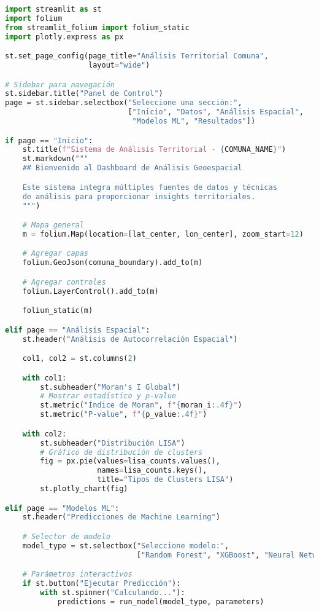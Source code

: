 \documentclass[12pt,a4paper]{article}
\begin{document}
\begin{lstlisting}[language=Python]
import streamlit as st
import folium
from streamlit_folium import folium_static
import plotly.express as px

st.set_page_config(page_title="Análisis Territorial Comuna",
                   layout="wide")

# Sidebar para navegación
st.sidebar.title("Panel de Control")
page = st.sidebar.selectbox("Seleccione una sección:",
                            ["Inicio", "Datos", "Análisis Espacial",
                             "Modelos ML", "Resultados"])

if page == "Inicio":
    st.title(f"Sistema de Análisis Territorial - {COMUNA_NAME}")
    st.markdown("""
    ## Bienvenido al Dashboard de Análisis Geoespacial

    Este sistema integra múltiples fuentes de datos y técnicas
    de análisis para proporcionar insights territoriales.
    """)

    # Mapa general
    m = folium.Map(location=[lat_center, lon_center], zoom_start=12)

    # Agregar capas
    folium.GeoJson(comuna_boundary).add_to(m)

    # Agregar controles
    folium.LayerControl().add_to(m)

    folium_static(m)

elif page == "Análisis Espacial":
    st.header("Análisis de Autocorrelación Espacial")

    col1, col2 = st.columns(2)

    with col1:
        st.subheader("Moran's I Global")
        # Mostrar estadístico y p-value
        st.metric("Índice de Moran", f"{moran_i:.4f}")
        st.metric("P-value", f"{p_value:.4f}")

    with col2:
        st.subheader("Distribución LISA")
        # Gráfico de distribución de clusters
        fig = px.pie(values=lisa_counts.values(),
                     names=lisa_counts.keys(),
                     title="Tipos de Clusters LISA")
        st.plotly_chart(fig)

elif page == "Modelos ML":
    st.header("Predicciones de Machine Learning")

    # Selector de modelo
    model_type = st.selectbox("Seleccione modelo:",
                              ["Random Forest", "XGBoost", "Neural Network"])

    # Parámetros interactivos
    if st.button("Ejecutar Predicción"):
        with st.spinner("Calculando..."):
            predictions = run_model(model_type, parameters)


\end{lstlisting}
\end{document}
